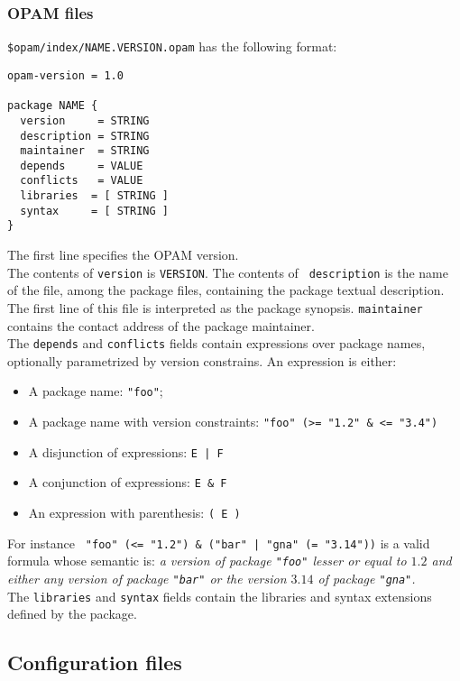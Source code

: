 \documentclass[a4paper,11pt]{article}
\begin{document}
\subsubsection{OPAM files}
\label{opam}

{\tt \$opam/index/NAME.VERSION.opam} has the following format:

\begin{verbatim}
opam-version = 1.0

package NAME {
  version     = STRING
  description = STRING
  maintainer  = STRING
  depends     = VALUE
  conflicts   = VALUE
  libraries  = [ STRING ]
  syntax     = [ STRING ]
}
\end{verbatim}

The first line specifies the OPAM version. \\

The contents of {\tt version} is {\tt VERSION}. The contents of {\tt
  description} is the name of the file, among the package files,
containing the package textual description. The first line of this
file is interpreted as the package synopsis. {\tt maintainer} contains
the contact address of the package maintainer. \\

The {\tt depends} and {\tt conflicts} fields contain expressions over
package names, optionally parametrized by version constrains. An
expression is either:

\begin{itemize}
\item A package name: {\tt "foo"};
\item A package name with version constraints:
  \verb+"foo" (>= "1.2" & <= "3.4")+
\item A disjunction of expressions: \verb+E | F+
\item A conjunction of expressions: \verb+E & F+
\item An expression with parenthesis: \verb+( E )+
\end{itemize}

For instance \verb+ "foo" (<= "1.2") & ("bar" | "gna" (= "3.14"))+
is a valid formula whose semantic is: {\em a version of package
  {\tt "foo"} lesser or equal to $1.2$ and either any version of
  package {\tt "bar"} or the version $3.14$ of package {\tt "gna"}.}
\\

The {\tt libraries} and {\tt syntax} fields contain the libraries and
syntax extensions defined by the package.

\subsection{Configuration files}
\label{pconfig}
\end{document}
